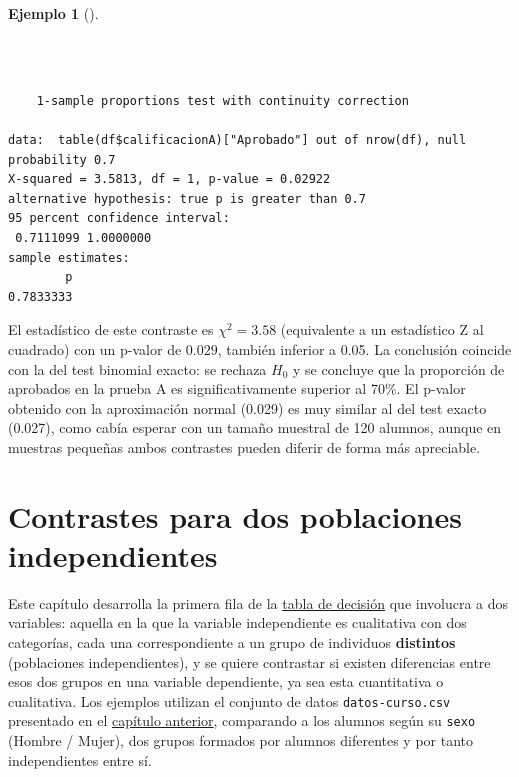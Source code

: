 \documentclass[
  spanish,
  a4paper,
]{scrreport}
\newenvironment{Shaded}{\begin{snugshade}}{\end{snugshade}}
\newcommand{\AttributeTok}[1]{\textcolor[rgb]{0.40,0.45,0.13}{#1}}
\newcommand{\FloatTok}[1]{\textcolor[rgb]{0.68,0.00,0.00}{#1}}
\newcommand{\FunctionTok}[1]{\textcolor[rgb]{0.28,0.35,0.67}{#1}}
\newcommand{\NormalTok}[1]{\textcolor[rgb]{0.00,0.23,0.31}{#1}}
\newcommand{\SpecialCharTok}[1]{\textcolor[rgb]{0.37,0.37,0.37}{#1}}
\newcommand{\StringTok}[1]{\textcolor[rgb]{0.13,0.47,0.30}{#1}}
\theoremstyle{definition}
\newtheorem{example}{Ejemplo}[chapter]
\theoremstyle{definition}
\theoremstyle{remark}
\begin{document}
\begin{example}[]\protect\hypertarget{exm-unapoblacion-test-z-proporcion}{}\label{exm-unapoblacion-test-z-proporcion}

~

\begin{Shaded}
\end{Shaded}

\begin{verbatim}

    1-sample proportions test with continuity correction

data:  table(df$calificacionA)["Aprobado"] out of nrow(df), null probability 0.7
X-squared = 3.5813, df = 1, p-value = 0.02922
alternative hypothesis: true p is greater than 0.7
95 percent confidence interval:
 0.7111099 1.0000000
sample estimates:
        p 
0.7833333 
\end{verbatim}

El estadístico de este contraste es \(\chi^2=3.58\) (equivalente a un
estadístico Z al cuadrado) con un p-valor de \(0.029\), también inferior
a 0.05. La conclusión coincide con la del test binomial exacto: se
rechaza \(H_0\) y se concluye que la proporción de aprobados en la
prueba A es significativamente superior al 70\%. El p-valor obtenido con
la aproximación normal (0.029) es muy similar al del test exacto
(0.027), como cabía esperar con un tamaño muestral de 120 alumnos,
aunque en muestras pequeñas ambos contrastes pueden diferir de forma más
apreciable.

\end{example}

\chapter{Contrastes para dos poblaciones
independientes}\label{contrastes-para-dos-poblaciones-independientes}

Este capítulo desarrolla la primera fila de la
\hyperref[selecciuxf3n-del-contraste-estaduxedstico-1]{tabla de
decisión} que involucra a dos variables: aquella en la que la variable
independiente es cualitativa con dos categorías, cada una
correspondiente a un grupo de individuos \textbf{distintos} (poblaciones
independientes), y se quiere contrastar si existen diferencias entre
esos dos grupos en una variable dependiente, ya sea esta cuantitativa o
cualitativa. Los ejemplos utilizan el conjunto de datos
\texttt{datos-curso.csv} presentado en el
\hyperref[selecciuxf3n-del-contraste-estaduxedstico-1]{capítulo
anterior}, comparando a los alumnos según su \texttt{sexo} (Hombre /
Mujer), dos grupos formados por alumnos diferentes y por tanto
independientes entre sí.
\end{document}
